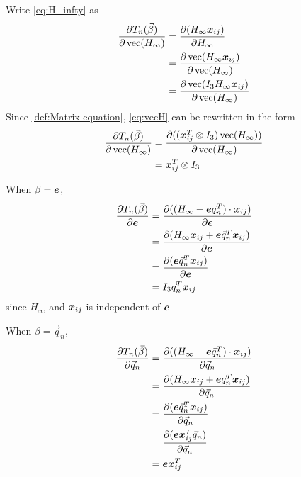 Write \cref{eq:H_infty} as
\begin{align}\label{eq:vecH}
	\frac{\partial T_n(\vec{\beta})}{\partial \operatorname {vec}(H_\infty)} &= \frac{\partial (H_{\infty} \boldsymbol{x}_{ij})} {\partial H_\infty} \nonumber \\
	& =  \frac{\partial \operatorname {vec}(H_{\infty} \boldsymbol{x}_{ij})} {\partial \operatorname {vec}(H_\infty)} \nonumber \\
	& = \frac{\partial \operatorname {vec}(I_3 H_{\infty} \boldsymbol{x}_{ij})} {\partial \operatorname {vec}(H_\infty)}
\end{align}
Since \cref{def:Matrix equation}, \cref{eq:vecH} can be rewritten in the form
\begin{align}\label{eq:H_infty2}
	\frac{\partial T_n(\vec{\beta})}{\partial \operatorname {vec}(H_\infty)} & =  \frac{\partial ((\boldsymbol{x}_{ij}^T \otimes I_3)\operatorname {vec}( H_{\infty}))} {\partial \operatorname {vec}(H_\infty)} \nonumber \\
	& = \boldsymbol{x}_{ij}^T \otimes I_3
\end{align}

When $\beta =  \boldsymbol{e}$, 
\begin{align}\label{eq:e1}
	\frac{\partial T_n(\vec{\beta})}{\partial \boldsymbol{e}} & = \frac{\partial ((H_{\infty} + \boldsymbol{e} \vec{q}_{n}^T) \cdot \boldsymbol{x}_{ij})} {\partial \boldsymbol{e}} \nonumber \\
	& = \frac{\partial (H_{\infty} \boldsymbol{x}_{ij} + \boldsymbol{e} \vec{q}_{n}^T \boldsymbol{x}_{ij} )}{\partial \boldsymbol{e}}  \nonumber \\
	& = \frac{\partial (\boldsymbol{e} \vec{q}_{n}^T \boldsymbol{x}_{ij})} {\partial \boldsymbol{e}} \nonumber \\
	& = I_3 \vec{q}_{n}^T \boldsymbol{x}_{ij}
\end{align}
since $H_\infty$ and $\boldsymbol{x}_{ij}$ is independent of $\boldsymbol{e}$


When $\beta = \vec{q}_n$,
\begin{align}\label{eq:q_n}
	\frac{\partial T_n(\vec{\beta})}{\partial \vec{q}_n} & = \frac{\partial ((H_{\infty} + \boldsymbol{e} \vec{q}_n^T) \cdot \boldsymbol{x}_{ij})} {\partial \vec{q}_n} \nonumber \\
	& = \frac{\partial (H_{\infty} \boldsymbol{x}_{ij} + \boldsymbol{e} \vec{q}_n^T \boldsymbol{x}_{ij})}{\partial \vec{q}_n}  \nonumber \\
	& = \frac{\partial (\boldsymbol{e} \vec{q}_n^T \boldsymbol{x}_{ij})} {\partial \vec{q}_n} \nonumber \\
	& = \frac{\partial (\boldsymbol{e} \boldsymbol{x}_{ij}^T \vec{q}_n)} {\partial \vec{q}_n} \nonumber \\
	& = \boldsymbol{e} \boldsymbol{x}_{ij}^T
\end{align}

